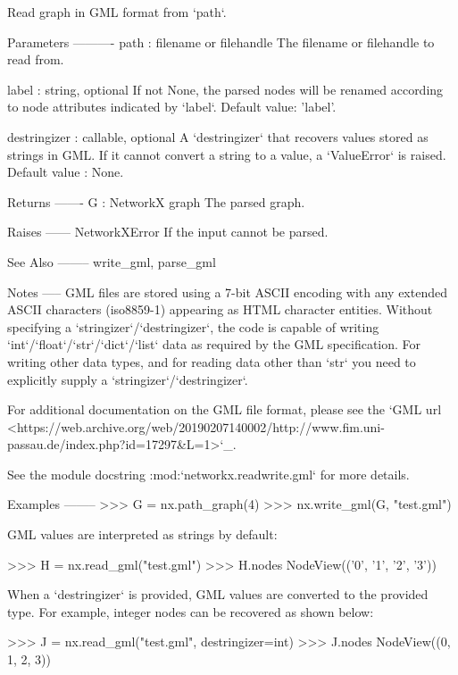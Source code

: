 \begin{DoxyVerb}Read graph in GML format from `path`.

Parameters
----------
path : filename or filehandle
    The filename or filehandle to read from.

label : string, optional
    If not None, the parsed nodes will be renamed according to node
    attributes indicated by `label`. Default value: 'label'.

destringizer : callable, optional
    A `destringizer` that recovers values stored as strings in GML. If it
    cannot convert a string to a value, a `ValueError` is raised. Default
    value : None.

Returns
-------
G : NetworkX graph
    The parsed graph.

Raises
------
NetworkXError
    If the input cannot be parsed.

See Also
--------
write_gml, parse_gml

Notes
-----
GML files are stored using a 7-bit ASCII encoding with any extended
ASCII characters (iso8859-1) appearing as HTML character entities.
Without specifying a `stringizer`/`destringizer`, the code is capable of
writing `int`/`float`/`str`/`dict`/`list` data as required by the GML
specification.  For writing other data types, and for reading data other
than `str` you need to explicitly supply a `stringizer`/`destringizer`.

For additional documentation on the GML file format, please see the
`GML url <https://web.archive.org/web/20190207140002/http://www.fim.uni-passau.de/index.php?id=17297&L=1>`_.

See the module docstring :mod:`networkx.readwrite.gml` for more details.

Examples
--------
>>> G = nx.path_graph(4)
>>> nx.write_gml(G, "test.gml")

GML values are interpreted as strings by default:

>>> H = nx.read_gml("test.gml")
>>> H.nodes
NodeView(('0', '1', '2', '3'))

When a `destringizer` is provided, GML values are converted to the provided type.
For example, integer nodes can be recovered as shown below:

>>> J = nx.read_gml("test.gml", destringizer=int)
>>> J.nodes
NodeView((0, 1, 2, 3))\end{DoxyVerb}
 \mbox{\label{namespacenetworkx_1_1readwrite_1_1gml_a9907ffa3702dcdddef892b199993d612}} 
